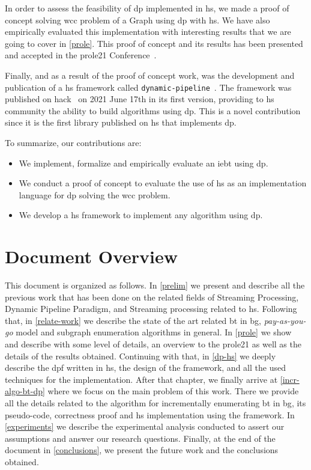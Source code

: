 In order to assess the feasibility of \acrshort{dp} implemented in \acrshort{hs}, we made a proof of concept solving \acrfull{wcc} problem of a Graph 
using \acrshort{dp} with \acrshort{hs}. We have also empirically evaluated this implementation with interesting results that we are going to cover in \autoref{prole}. 
This proof of concept and its results has been presented and accepted in the \acrfull{prole21} Conference~\cite{prole21}. 

Finally, and as a result of the proof of concept work, was the development and publication of a \acrshort{hs} framework called \texttt{dynamic-pipeline}~\cite{dynamic-pipeline}. 
The framework was published on \acrfull{hack}~\cite{hackage} on 2021 June 17th in its first version,
providing to \acrshort{hs} community the ability to build algorithms using \acrshort{dp}. This is a novel contribution since it is the first library published on \acrshort{hs}
that implements \acrshort{dp}.

To summarize, our contributions are:
\begin{itemize}
  \item We implement, formalize and empirically evaluate an \acrlong{iebt} using \acrlong{dp}.
  \item We conduct a proof of concept to evaluate the use of \acrlong{hs} as an implementation language for \acrlong{dp} solving the \acrlong{wcc} problem.
  \item We develop a \acrshort{hs} framework to implement any algorithm using \acrlong{dp}.
\end{itemize}

\section{Document Overview}
This document is organized as follows. In \autoref{prelim} we present and describe all the previous work that has been done on the related fields of Streaming Processing, Dynamic Pipeline Paradigm, and Streaming processing related to \acrshort{hs}. 
Following that, in \autoref{relate-work} we describe the state of the art related \acrshort{bt} in \acrshort{bg}, \emph{pay-as-you-go} model and subgraph enumeration algorithms in general.
In \autoref{prole} we show and describe with some level of details, an overview to the \acrshort{prole21} as well as the details of the results obtained. 
Continuing with that, in \autoref{dp-hs} we deeply describe the \acrshort{dpf} written in \acrshort{hs}, the design of the framework, and all the used techniques for the implementation.
After that chapter, we finally arrive at \autoref{incr-algo-bt-dp} where we focus on the main problem of this work. There we provide all the details related to the algorithm for incrementally enumerating \acrshort{bt} in \acrshort{bg}, its pseudo-code,
correctness proof and \acrshort{hs} implementation using the framework.
In \autoref{experiments} we describe the experimental analysis conducted to assert our assumptions and answer our research questions.
Finally, at the end of the document in \autoref{conclusions}, we present the future work and the conclusions obtained.

